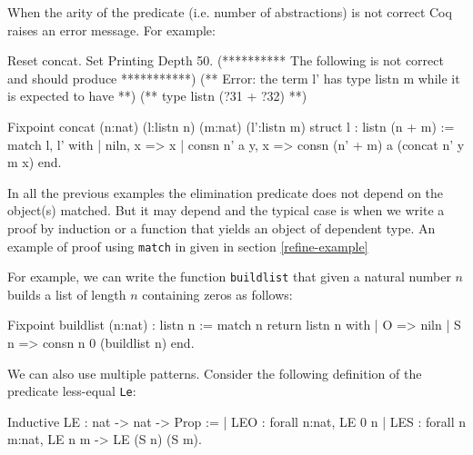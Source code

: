When the arity of the predicate (i.e. number of abstractions) is not
correct Coq raises an error message. For example:

\begin{coq_eval}
Reset concat.
Set Printing Depth 50.
(********** The following is not correct and should produce ***********)
(** Error: the term l' has type listn m while it is expected to have **)
(** type listn (?31 + ?32)                                           **)
\end{coq_eval}
\begin{coq_example}
Fixpoint concat
 (n:nat) (l:listn n) (m:nat)
 (l':listn m) {struct l} : listn (n + m) :=
  match l, l' with
  | niln, x => x
  | consn n' a y, x => consn (n' + m) a (concat n' y m x)
  end.
\end{coq_example}

In all the previous examples the elimination predicate does not depend
on the object(s) matched. But it may depend and the typical case 
is when we write a proof by induction or a function that yields an
object of dependent type. An example of proof using \texttt{match} in
given in section \ref{refine-example}

For example, we can write 
the function \texttt{buildlist} that given a natural number
$n$ builds a list of length $n$ containing zeros as follows:

\begin{coq_example}
Fixpoint buildlist (n:nat) : listn n :=
  match n return listn n with
  | O => niln
  | S n => consn n 0 (buildlist n)
  end.
\end{coq_example}

We can also use multiple patterns. 
Consider the following definition of the predicate less-equal
\texttt{Le}:

\begin{coq_example}
Inductive LE : nat -> nat -> Prop :=
  | LEO : forall n:nat, LE 0 n
  | LES : forall n m:nat, LE n m -> LE (S n) (S m).
\end{coq_example}

